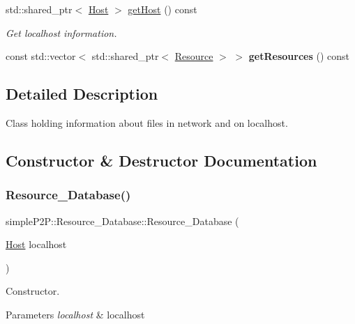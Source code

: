\begin{DoxyCompactItemize}
std\+::shared\+\_\+ptr$<$ \hyperlink{classsimpleP2P_1_1Host}{Host} $>$ \hyperlink{classsimpleP2P_1_1Resource__Database_a3d3e448f6b0502129e68d42214e1a059}{get\+Host} () const
\begin{DoxyCompactList}\small\item\em Get localhost information. \end{DoxyCompactList}\item 
\mbox{\label{classsimpleP2P_1_1Resource__Database_a97b8e423121d50cf2593ccd4cfef4ca9}} 
const std\+::vector$<$ std\+::shared\+\_\+ptr$<$ \hyperlink{classsimpleP2P_1_1Resource}{Resource} $>$ $>$ {\bfseries get\+Resources} () const
\end{DoxyCompactItemize}


\subsection{Detailed Description}
Class holding information about files in network and on localhost. 

\subsection{Constructor \& Destructor Documentation}
\mbox{\label{classsimpleP2P_1_1Resource__Database_a0158b1b1c4583d60534c2bea5dc437a3}} 
\subsubsection{\texorpdfstring{Resource\+\_\+\+Database()}{Resource\_Database()}}
{\footnotesize\ttfamily simple\+P2\+P\+::\+Resource\+\_\+\+Database\+::\+Resource\+\_\+\+Database (\begin{DoxyParamCaption}\item[{\hyperlink{classsimpleP2P_1_1Host}{Host}}]{localhost }\end{DoxyParamCaption})}



Constructor. 


\begin{DoxyParams}{Parameters}
{\em localhost} & localhost \\
\hline
\end{DoxyParams}


